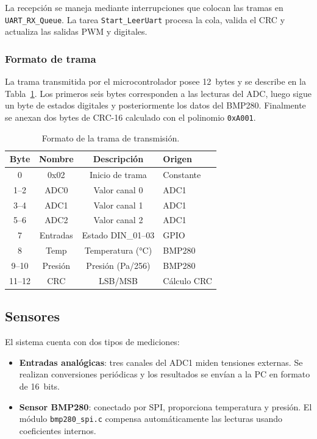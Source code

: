\documentclass{article}
\begin{document}
La recepción se maneja mediante interrupciones que colocan las tramas en \texttt{UART\_RX\_Queue}. La tarea \texttt{Start\_LeerUart} procesa la cola, valida el CRC y actualiza las salidas PWM y digitales.

\subsubsection{Formato de trama}
La trama transmitida por el microcontrolador posee 12~bytes y se describe en la Tabla~\ref{tab:trama}. Los primeros seis bytes corresponden a las lecturas del ADC, luego sigue un byte de estados digitales y posteriormente los datos del BMP280. Finalmente se anexan dos bytes de CRC-16 calculado con el polinomio \texttt{0xA001}.

\begin{table}[h!]
\centering
\begin{tabular}{|c|c|c|l|}
\hline
\textbf{Byte} & \textbf{Nombre} & \textbf{Descripción} & \textbf{Origen}\\ \hline
0 & 0x02 & Inicio de trama & Constante\\ \hline
1--2 & ADC0 & Valor canal 0 & ADC1\\ \hline
3--4 & ADC1 & Valor canal 1 & ADC1\\ \hline
5--6 & ADC2 & Valor canal 2 & ADC1\\ \hline
7 & Entradas & Estado DIN\_01--03 & GPIO\\ \hline
8 & Temp & Temperatura (°C) & BMP280\\ \hline
9--10 & Presión & Presión (Pa/256) & BMP280\\ \hline
11--12 & CRC & LSB/MSB & Cálculo CRC\\ \hline
\end{tabular}
\caption{Formato de la trama de transmisión.}
\label{tab:trama}
\end{table}

\subsection{Sensores}
El sistema cuenta con dos tipos de mediciones:
\begin{itemize}
  \item \textbf{Entradas analógicas}: tres canales del ADC1 miden tensiones externas. Se realizan conversiones periódicas y los resultados se envían a la PC en formato de 16~bits.
  \item \textbf{Sensor BMP280}: conectado por SPI, proporciona temperatura y presión. El módulo \texttt{bmp280\_spi.c} compensa automáticamente las lecturas usando coeficientes internos.
\end{itemize}
\end{document}
